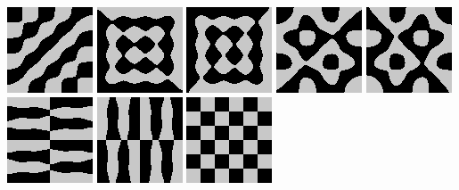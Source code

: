 \includegraphics{o/dchladni_041.png}
\includegraphics{o/dchladni_042.png}
\includegraphics{o/dchladni_043.png}
\includegraphics{o/dchladni_044.png}
\includegraphics{o/dchladni_045.png}
\includegraphics{o/dchladni_046.png}
\includegraphics{o/dchladni_047.png}
\includegraphics{o/dchladni_048.png}

